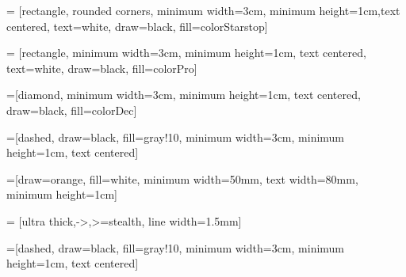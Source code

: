\usetikzlibrary{shapes.geometric, arrows, positioning, calc}

 = [rectangle, rounded corners, minimum width=3cm,
minimum height=1cm,text centered,  text=white, draw=black,
fill=colorStarstop]

 = [rectangle, minimum width=3cm, minimum height=1cm,
text centered, text=white, draw=black, fill=colorPro]

=[diamond, minimum width=3cm, minimum height=1cm,
text centered, draw=black, fill=colorDec]

=[dashed, draw=black, fill=gray!10, minimum width=3cm, minimum height=1cm, text centered]

=[draw=orange, fill=white, minimum width=50mm, text width=80mm, minimum height=1cm]

 = [ultra thick,->,>=stealth, line width=1.5mm]

=[dashed, draw=black, fill=gray!10, minimum width=3cm, minimum height=1cm, text centered]


\usetikzlibrary{positioning}

